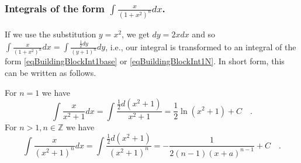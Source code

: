 \documentclass[12pt]{book}
\begin{document}
\subsubsection{Integrals of the form $\displaystyle\int \frac{x}{(1+x ^2)^n} dx $.}
If we use the substitution $y=x^2$, we get $dy=2xdx $ and so $\displaystyle\int \frac{x}{(1+x ^2)^n} dx = \displaystyle\int \frac{\frac12 dy}{(y+1)^n} dy $, i.e., our integral is transformed to an integral of the form \eqref{eqBuildingBlockInt1base} or  \eqref{eqBuildingBlockInt1N}. In short form, this can be written as follows. 

For $n=1$ we have
\[
\int \frac{x}{x^2+1}dx= \int \frac{\frac{1}2 d(x^2+1)}{x^2+1}= \frac{1}{2}\ln (x^2+1) +C\quad .
\]
For $n>1, n\in \mathbb Z$ we have
\[
\int \frac{x}{(x^2+1)^n}dx= \int \frac{\frac{1}2d(x^2+1)}{(x^2+1)^n}= -\frac{1}{2(n-1)(x+a)^{n-1} } +C\quad .
\]
\end{document}
